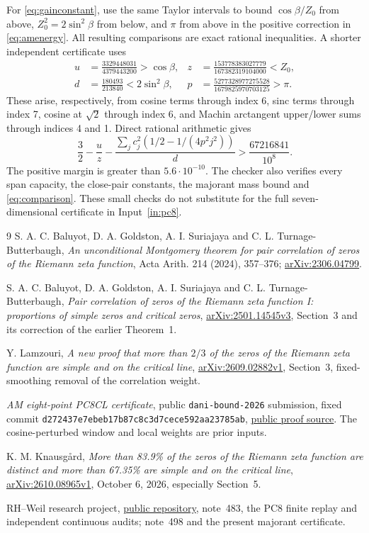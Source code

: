 \documentclass[11pt,a4paper]{article}
\theoremstyle{remark}
\begin{document}
For \eqref{eq:gainconstant}, use the same Taylor intervals
to bound $\cos\beta/Z_0$ from above, $Z_0^2=2\sin^2\beta$
from below, and $\pi$ from above in the positive correction
in \eqref{eq:amenergy}. All resulting comparisons are exact rational
inequalities. A shorter independent certificate uses
\[
\begin{aligned}
 u&=\frac{3329448031}{4379443200}>\cos\beta,&
 z&=\frac{153778383027779}{167382319104000}<Z_0,\\
 d&=\frac{180493}{213840}<2\sin^2\beta,&
 p&=\frac{5277328977275528}{1679825970703125}>\pi.
\end{aligned}
\]
These arise, respectively, from cosine terms through index 6,
sinc terms through index 7, cosine at $\sqrt2$ through index 6,
and Machin arctangent upper/lower sums through indices 4 and 1.
Direct rational arithmetic gives
\[
 \frac32-\frac uz-
 \frac{\sum_jc_j^2(1/2-1/(4p^2j^2))}{d}
 >\frac{67216841}{10^8}.
\]
The positive margin is greater than $5.6\cdot10^{-10}$.
The checker also verifies every span capacity, the close-pair
constants, the majorant mass bound and
\eqref{eq:comparison}. These small checks do not substitute for
the full seven-dimensional certificate in Input~\ref{in:pc8}.

\begin{thebibliography}{9}
S. A. C. Baluyot, D. A. Goldston, A. I. Suriajaya and
C. L. Turnage-Butterbaugh,
\emph{An unconditional Montgomery theorem for pair correlation of
zeros of the Riemann zeta function},
Acta Arith. 214 (2024), 357--376;
\href{https://arxiv.org/abs/2306.04799}{arXiv:2306.04799}.

S. A. C. Baluyot, D. A. Goldston, A. I. Suriajaya and
C. L. Turnage-Butterbaugh,
\emph{Pair correlation of zeros of the Riemann zeta function I:
proportions of simple zeros and critical zeros},
\href{https://arxiv.org/abs/2501.14545v3}{arXiv:2501.14545v3},
Section~3 and its correction of the earlier Theorem~1.

Y. Lamzouri,
\emph{A new proof that more than $2/3$ of the zeros of the Riemann
zeta function are simple and on the critical line},
\href{https://arxiv.org/abs/2609.02882v1}{arXiv:2609.02882v1},
Section~3, fixed-smoothing removal of the correlation weight.

\emph{AM eight-point PC8CL certificate}, public
\texttt{dani-bound-2026} submission, fixed commit
\texttt{d272437e7ebeb17b87c8c3d7cece592aa23785ab},
\href{https://github.com/josusanmartin/riemann/tree/d272437e7ebeb17b87c8c3d7cece592aa23785ab/submissions/dani-bound-2026/proof}{public proof source}.
The cosine-perturbed window and local weights are prior inputs.

K. M. Knausg{\aa}rd,
\emph{More than 83.9\% of the zeros of the Riemann zeta function
are distinct and more than 67.35\% are simple and on the critical line},
\href{https://arxiv.org/abs/2610.08965v1}{arXiv:2610.08965v1},
October 6, 2026, especially Section~5.

RH--Weil research project,
\href{https://github.com/lixiang90/RH-Weil}{public repository},
note~483, the PC8 finite replay and independent continuous audits;
note~498 and the present majorant certificate.
\end{thebibliography}
\end{document}
